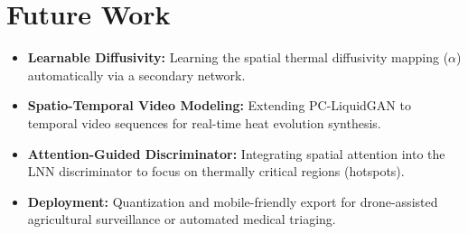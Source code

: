 \documentclass[12pt,a4paper]{report}
\begin{document}
\section{Future Work}
\begin{itemize}
    \item \textbf{Learnable Diffusivity:} Learning the spatial thermal diffusivity mapping ($\alpha$) automatically via a secondary network.
    \item \textbf{Spatio-Temporal Video Modeling:} Extending PC-LiquidGAN to temporal video sequences for real-time heat evolution synthesis.
    \item \textbf{Attention-Guided Discriminator:} Integrating spatial attention into the LNN discriminator to focus on thermally critical regions (hotspots).
    \item \textbf{Deployment:} Quantization and mobile-friendly export for drone-assisted agricultural surveillance or automated medical triaging.
\end{itemize}
\end{document}

